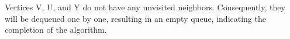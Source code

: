 \documentclass[preview]{standalone}
\begin{document}
\begin{center}
Vertices V, U, and Y do not have any unvisited neighbors. Consequently, they will be dequeued one by one, resulting in an empty queue, indicating the completion of the algorithm.
\end{center}
\end{document}
